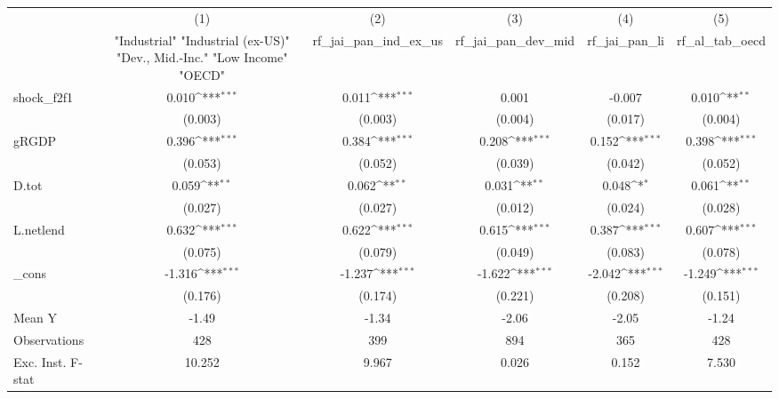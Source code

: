 {
\def\sym#1{\ifmmode^{#1}\else\(^{#1}\)\fi}
\begin{tabular}{l*{5}{c}}
\toprule
            &\multicolumn{1}{c}{(1)}&\multicolumn{1}{c}{(2)}&\multicolumn{1}{c}{(3)}&\multicolumn{1}{c}{(4)}&\multicolumn{1}{c}{(5)}\\
            &\multicolumn{1}{c}{ "Industrial" "Industrial (ex-US)" "Dev., Mid.-Inc." "Low Income" "OECD" }&\multicolumn{1}{c}{rf\_jai\_pan\_ind\_ex\_us}&\multicolumn{1}{c}{rf\_jai\_pan\_dev\_mid}&\multicolumn{1}{c}{rf\_jai\_pan\_li}&\multicolumn{1}{c}{rf\_al\_tab\_oecd}\\
\midrule
shock\_f2f1  &       0.010\sym{***}&       0.011\sym{***}&       0.001         &      -0.007         &       0.010\sym{**} \\
            &     (0.003)         &     (0.003)         &     (0.004)         &     (0.017)         &     (0.004)         \\
\addlinespace
gRGDP       &       0.396\sym{***}&       0.384\sym{***}&       0.208\sym{***}&       0.152\sym{***}&       0.398\sym{***}\\
            &     (0.053)         &     (0.052)         &     (0.039)         &     (0.042)         &     (0.052)         \\
\addlinespace
D.tot       &       0.059\sym{**} &       0.062\sym{**} &       0.031\sym{**} &       0.048\sym{*}  &       0.061\sym{**} \\
            &     (0.027)         &     (0.027)         &     (0.012)         &     (0.024)         &     (0.028)         \\
\addlinespace
L.netlend   &       0.632\sym{***}&       0.622\sym{***}&       0.615\sym{***}&       0.387\sym{***}&       0.607\sym{***}\\
            &     (0.075)         &     (0.079)         &     (0.049)         &     (0.083)         &     (0.078)         \\
\addlinespace
\_cons      &      -1.316\sym{***}&      -1.237\sym{***}&      -1.622\sym{***}&      -2.042\sym{***}&      -1.249\sym{***}\\
            &     (0.176)         &     (0.174)         &     (0.221)         &     (0.208)         &     (0.151)         \\
\midrule
Mean Y      &       -1.49         &       -1.34         &       -2.06         &       -2.05         &       -1.24         \\
Observations&         428         &         399         &         894         &         365         &         428         \\
Exc. Inst. F-stat&      10.252         &       9.967         &       0.026         &       0.152         &       7.530         \\
\bottomrule
\end{tabular}
}
